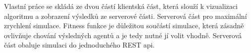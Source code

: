 Vlastní práce se skládá ze dvou částí klientská část, která slouží k vizualizaci algoritmu a zobrazení výsledků ze serverové části. Serverová část pro maximální zrychlení simulace. 
Fitness funkce je důležitou součástí simulace, která zásadně ovlivňuje chování výsledných agentů a je tedy nutné jí volit vhodně. 
Serverová část obaluje simulaci do jednoduchého REST api. 
